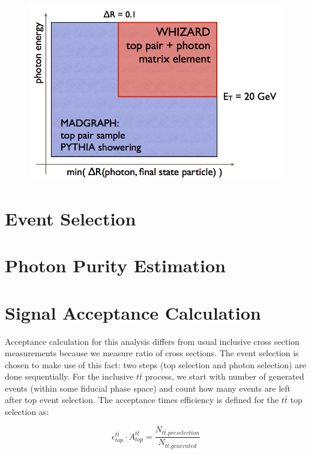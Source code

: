 \begin{figure} \label{fig-photonphasespace}
\begin{center}
\includegraphics[scale=0.5]{Figures/photonphasespace.png}
\caption{}
\end{center}
\end{figure}

\section{Event Selection} \label{sec-EventSelection}

\section{Photon Purity Estimation} \label{sec-PhotonPurityEstimation}

\section{Signal Acceptance Calculation} \label{subsec-SignalAcceptanceCalculation}

Acceptance calculation for this analysis differs from usual inclusive cross section measurements because we measure ratio of cross sections. The event selection is chosen to make use of this fact: two steps (top selection and photon selection) are done sequentially. For the inclusive $t\bar{t}$ process, we start with number of generated events (within some fiducial phase space) and count how many events are left after top event selection. The acceptance times efficiency is defined for the $t\bar{t}$ top selection as:

\begin{equation}
	\epsilon^{t\bar{t}}_{top} \cdot A^{t\bar{t}}_{top} = \frac{N_{t\bar{t}.preselection}}{N_{t\bar{t}.generated}} 
\end{equation}

